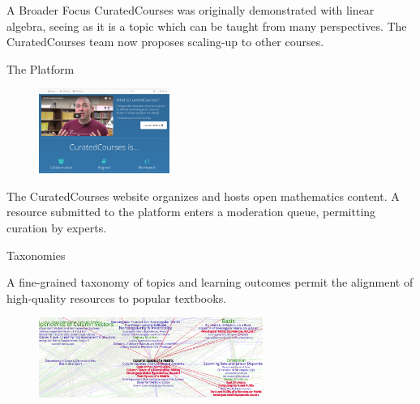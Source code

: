 
\begin{sectionblock}{A Broader Focus}
  CuratedCourses was originally demonstrated with linear algebra,
  seeing as it is a topic which can be taught from many perspectives.
  The CuratedCourses team now proposes scaling-up to other courses.
\end{sectionblock}

\vspace{1ex}

\begin{sectionblock}{The Platform}

  \begin{figure}
    \includegraphics[width=0.38\textwidth]{landing-page.png}
  \end{figure}

  The CuratedCourses website organizes and hosts open mathematics content.  A resource submitted to the
  platform enters a moderation queue, permitting curation by experts.
\end{sectionblock}

\vspace{1ex}

  \begin{sectionblock}{Taxonomies}
  
    A fine-grained taxonomy of
   topics and learning outcomes
  permit the alignment of high-quality resources to popular textbooks.

    \begin{figure}
      \includegraphics[width=0.65\textwidth]{topics.png}
    \end{figure}
  
\end{sectionblock}


    
